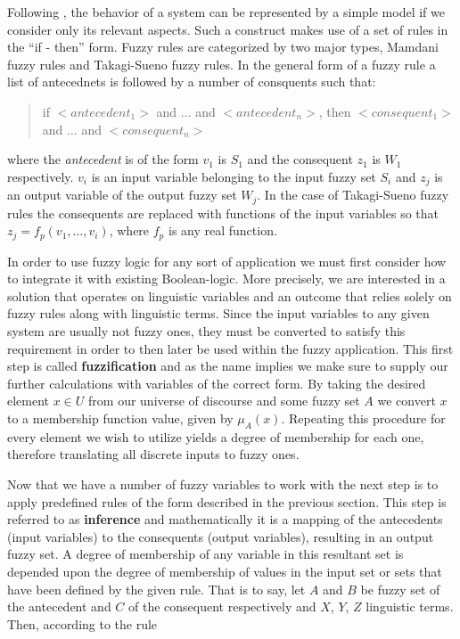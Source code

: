 Following \cite{sabri2013}, the behavior of a system can be represented by a simple model if we consider only its relevant aspects. Such a construct makes use of a set of rules in the ``if - then'' form. Fuzzy rules are categorized by two major types, Mamdani fuzzy rules and Takagi-Sueno fuzzy rules. In the general form of a fuzzy rule a list of antecednets is followed by a number of consquents such that:

\begin{quote}
	if $<antecedent_1>$ and $\ldots$ and $<antecedent_n>$, then
	$<consequent_1>$ and $\ldots$ and $<consequent_n>$
\end{quote}

\noindent where the \textit{antecedent} is of the form $v_1$ is $S_1$ and the consequent $z_1$ is $W_1$ respectively. $v_i$ is an input variable belonging to the input fuzzy set $S_i$ and $z_j$ is an output variable of the output fuzzy set $W_j$.
In the case of Takagi-Sueno fuzzy rules the consequents are replaced with functions of the input variables so that $z_j = f_p(v_1, \ldots, v_i)$, where $f_p$ is any real function.

In order to use fuzzy logic for any sort of application we must first consider how to integrate it with existing Boolean-logic. More precisely, we are interested in a solution that operates on linguistic variables and an outcome that relies solely on fuzzy rules along with linguistic terms. Since the input variables to any given system are usually not fuzzy ones, they must be converted to satisfy this requirement in order to then later be used within the fuzzy application. This first step is called \textbf{fuzzification} and as the name implies we make sure to supply our further calculations with variables of the correct form. By taking the desired element $x \in U$ from our universe of discourse and some fuzzy set $A$ we convert $x$ to a membership function value, given by $\mu_{A}(x)$. Repeating this procedure for every element we wish to utilize yields a degree of membership for each one, therefore translating all discrete inputs to fuzzy ones.

Now that we have a number of fuzzy variables to work with the next step is to apply predefined rules of the form described in the previous section. This step is referred to as \textbf{inference} and mathematically it is a mapping of the antecedents (input variables) to the consequents (output variables), resulting in an output fuzzy set. A degree of membership of any variable in this resultant set is depended upon the degree of membership of values in the input set or sets that have been defined by the given rule. That is to say, let $A$ and $B$ be fuzzy set of the antecedent and $C$ of the consequent respectively and $X$, $Y$, $Z$ linguistic terms. Then, according to the rule 
	
